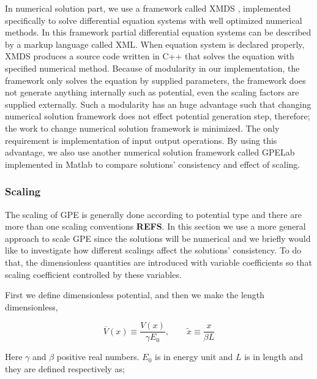 \documentclass[a4paper,times,hidelinks,12pt]{article}
\begin{document}
In numerical solution part, we use a framework called XMDS \cite{dennis2013xmds2}, implemented specifically to solve differential equation systems with well optimized numerical methods. In this framework partial differential equation systems can be described by a markup language called XML.  When equation system is declared properly, XMDS produces a source code written in C++ that solves the equation with specified numerical method. Because of modularity in our implementation, the framework only solves the equation by supplied parameters, the framework does not generate anything internally such as potential, even the scaling factors are supplied externally. Such a modularity has an huge advantage such that changing numerical solution framework does not effect potential generation step, therefore; the work to change numerical solution framework is minimized. The only requirement is implementation of input output operations. By using this advantage, we also use another numerical solution framework called GPELab \cite{antoine2014gpelab} implemented in Matlab to compare solutions' consistency and effect of scaling.


\subsubsection{Scaling}

The scaling of GPE is generally done according to potential type and there are more than one scaling conventions \textbf{REFS}. In this section we use a more general approach to scale GPE since the solutions will be numerical and we briefly would like to investigate how different scalings affect the solutions' consistency. To do that, the dimensionless quantities are introduced with variable coefficients so that scaling coefficient controlled by these variables. 

First we define dimensionless potential, and then we make the length dimensionless,



$$ \overline{V}(x) \equiv \frac{V(x)}{\gamma E_0}, \qquad \widetilde{x} \equiv \frac{x}{\beta L} $$

\noindent Here $\gamma$ and $\beta$ positive real numbers. $E_0$ is in energy unit and $L$ is in length and they are defined respectively as;
\end{document}
